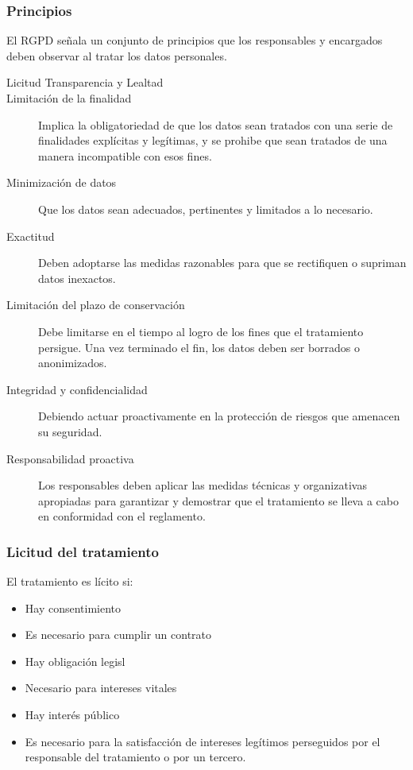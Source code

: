     \subsubsection{Principios}
        El RGPD señala un conjunto de principios que los responsables y encargados deben observar al tratar los datos personales.
        \begin{description}
            \item[Licitud Transparencia y Lealtad]
            \item[Limitación de la finalidad] Implica la obligatoriedad de que los datos sean tratados con una serie de finalidades explícitas y legítimas, y se prohibe que sean tratados de una manera incompatible con esos fines.
            \item[Minimización de datos] Que los datos sean adecuados, pertinentes y limitados a lo necesario. 
            \item[Exactitud] Deben adoptarse las medidas razonables para que se rectifiquen o supriman datos inexactos.
            \item[Limitación del plazo de conservación] Debe limitarse en el tiempo al logro de los fines que el tratamiento persigue. Una vez terminado el fin, los datos deben ser borrados o anonimizados.
            \item[Integridad y confidencialidad] Debiendo actuar proactivamente en la protección de riesgos que amenacen su seguridad.
            \item[Responsabilidad proactiva] Los responsables deben aplicar las medidas técnicas y organizativas apropiadas para garantizar y demostrar que el tratamiento se lleva a cabo en conformidad con el reglamento.
        \end{description}

    \subsubsection{Licitud del tratamiento}
        El tratamiento es lícito si:
        \begin{itemize}
            \item Hay consentimiento
            \item Es necesario para cumplir un contrato
            \item Hay obligación legisl
            \item Necesario para intereses vitales
            \item Hay interés público
            \item Es necesario para la satisfacción de intereses legítimos perseguidos por el responsable del tratamiento o por un tercero.
        \end{itemize}

